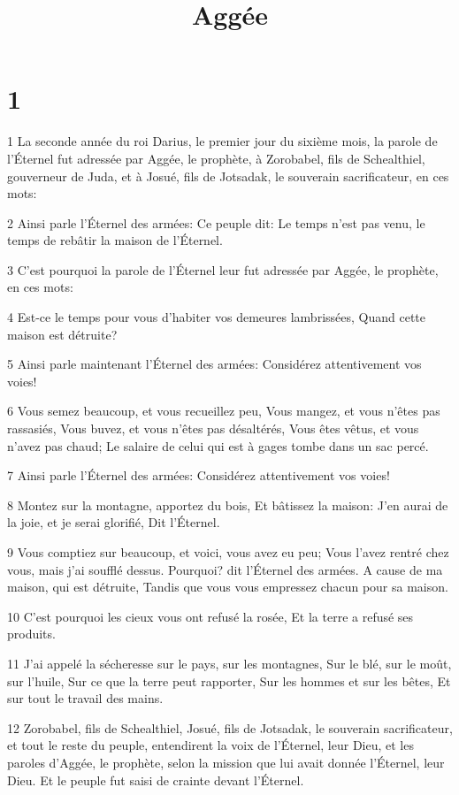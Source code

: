 

\title{Aggée}


\chapter{1}

\par 1 La seconde année du roi Darius, le premier jour du sixième mois, la parole de l'Éternel fut adressée par Aggée, le prophète, à Zorobabel, fils de Schealthiel, gouverneur de Juda, et à Josué, fils de Jotsadak, le souverain sacrificateur, en ces mots:
\par 2 Ainsi parle l'Éternel des armées: Ce peuple dit: Le temps n'est pas venu, le temps de rebâtir la maison de l'Éternel.
\par 3 C'est pourquoi la parole de l'Éternel leur fut adressée par Aggée, le prophète, en ces mots:
\par 4 Est-ce le temps pour vous d'habiter vos demeures lambrissées, Quand cette maison est détruite?
\par 5 Ainsi parle maintenant l'Éternel des armées: Considérez attentivement vos voies!
\par 6 Vous semez beaucoup, et vous recueillez peu, Vous mangez, et vous n'êtes pas rassasiés, Vous buvez, et vous n'êtes pas désaltérés, Vous êtes vêtus, et vous n'avez pas chaud; Le salaire de celui qui est à gages tombe dans un sac percé.
\par 7 Ainsi parle l'Éternel des armées: Considérez attentivement vos voies!
\par 8 Montez sur la montagne, apportez du bois, Et bâtissez la maison: J'en aurai de la joie, et je serai glorifié, Dit l'Éternel.
\par 9 Vous comptiez sur beaucoup, et voici, vous avez eu peu; Vous l'avez rentré chez vous, mais j'ai soufflé dessus. Pourquoi? dit l'Éternel des armées. A cause de ma maison, qui est détruite, Tandis que vous vous empressez chacun pour sa maison.
\par 10 C'est pourquoi les cieux vous ont refusé la rosée, Et la terre a refusé ses produits.
\par 11 J'ai appelé la sécheresse sur le pays, sur les montagnes, Sur le blé, sur le moût, sur l'huile, Sur ce que la terre peut rapporter, Sur les hommes et sur les bêtes, Et sur tout le travail des mains.
\par 12 Zorobabel, fils de Schealthiel, Josué, fils de Jotsadak, le souverain sacrificateur, et tout le reste du peuple, entendirent la voix de l'Éternel, leur Dieu, et les paroles d'Aggée, le prophète, selon la mission que lui avait donnée l'Éternel, leur Dieu. Et le peuple fut saisi de crainte devant l'Éternel.
